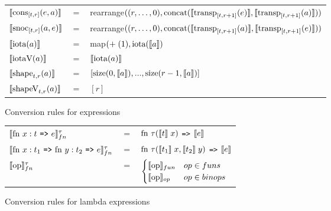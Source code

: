 \documentclass[11pt]{article}
\begin{document}
\begin{figure}
\begin{tabular}{@{}l c l}
$\llbracket \text{cons}_{[t,r]}(e,a) \rrbracket$ & $=$ & rearrange$((r,\ldots,0), \text{concat}(\llbracket \text{transp}_{[t,r+1]}(e) \rrbracket,\llbracket \text{transp}_{[t,r+1]}(a) \rrbracket))$\\
  
$\llbracket \text{snoc}_{[t,r]}(a,e) \rrbracket$ & $=$ & rearrange$((r,\ldots,0), \text{concat}(\llbracket \text{transp}_{[t,r+1]}(a) \rrbracket,\llbracket \text{transp}_{[t,r+1]}(e) \rrbracket))$\\

$\llbracket \text{iota}(a) \rrbracket$ & $=$ & map$(+ \; (1), \text{iota}(\llbracket a \rrbracket)$\\

$\llbracket \text{iotaV}(a) \rrbracket$ & $=$ & $\llbracket \text{iota}(a) \rrbracket$\\

$\llbracket \text{shape}_{t,r}(a) \rrbracket$ & $=$ & $[\text{size}(0,\llbracket a \rrbracket),...,\text{size}(r-1,\llbracket a \rrbracket)]$\\

$\llbracket \text{shapeV}_{t,r}(a) \rrbracket$ & $=$ & $[r]$\\
\end{tabular}
    \caption{Conversion rules for expressions}
    \label{fig:compilationscheme}
\end{figure}

\begin{figure}
\begin{tabular}{l c l}
$\evals{ \text{fn } x:t $ {\tt =>} $ e}^{\tau}_{fn} $ & $=$ & $ \text{fn } \tau (\llbracket t \rrbracket\; x) $ {\tt =>} $ \llbracket e \rrbracket$\\
$\evals{ \text{fn } x:t_1$ {\tt =>} $\text{fn } y:t_2 $ {\tt =>} $ e}^{\tau}_{fn} $ & $=$ & $ \text{fn } \tau (\llbracket t_1 \rrbracket\; x, \llbracket t_2 \rrbracket \; y) $ {\tt =>} $ \llbracket e \rrbracket$\\
$\llbracket \text{op} \rrbracket^{\tau}_{fn}$ & = & $ \begin{cases} \llbracket \text{op} \rrbracket_{fun} & op \in funs \\ \llbracket \text{op} \rrbracket_{op} & op \in binops \end{cases}$
\end{tabular}
    \caption{Conversion rules for lambda expressions}
    \label{fig:lambdas}
\end{figure}

\end{document}
